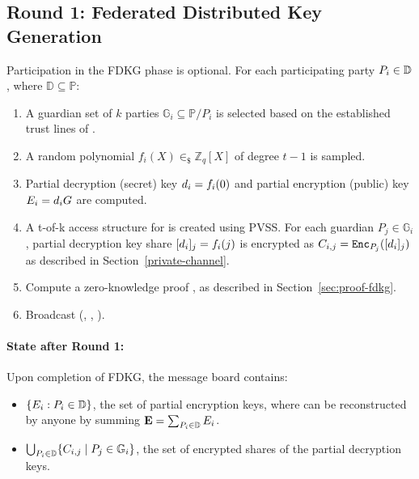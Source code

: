 \documentclass[runningheads]{llncs}
\begin{document}
\subsection{Round 1: Federated Distributed Key Generation}
Participation in the FDKG phase is optional. For each participating party $P_{i} \in \mathbb{D}$, where $\mathbb{D} \subseteq  \mathbb{P}$:
\begin{enumerate}
    \item A guardian set of $k$ parties $\mathbb{G}_i\subseteq \mathbb{P}/P_i$ is selected based on the established trust lines of .
    \item A random polynomial $f_{i}(X) \in_{\$} \mathbb{Z}_q[X]$ of degree $t-1$ is sampled.
    \item Partial decryption (secret) key $d_{i}= f_i(0)$ and partial encryption (public) key $E_{i} = d_{i} G$ are computed.
    \item A t-of-k access structure for  is created using PVSS. For each guardian $P_{j} \in \mathbb{G}_i$, partial decryption key share $[d_{i}]_{j}=f_i(j)$ is encrypted as $C_{i,j}=\texttt{Enc}_{P_{j}}([d_{i}]_{j})$ as described in Section~\ref{private-channel}.
    
    \item Compute a zero-knowledge proof , as described in Section~\ref{sec:proof-fdkg}.
    
    \item Broadcast (, , ).
\end{enumerate}

\paragraph*{State after Round 1:}
Upon completion of FDKG, the message board contains:
\begin{itemize}
    \item $\{E_{i} : P_{i} \in \mathbb{D}\}$, the set of partial encryption keys, where \EncryptionKey{} can be reconstructed by anyone by summing $\textbf{E}=\sum_{P_{i} \in \mathbb{D}} E_{i}$.
    \item $\bigcup_{P_{i} \in \mathbb{D}} \{C_{i,j} \mid P_j \in \mathbb{G}_i\}$, the set of encrypted shares of the partial decryption keys.  
\end{itemize}
\end{document}
